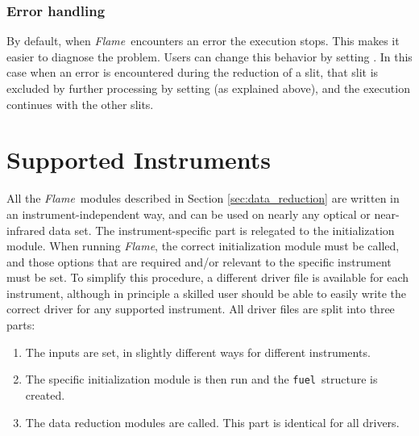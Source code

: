 \documentclass[a4paper]{article}
\newcommand{\flame}{\emph{Flame}}
\newcommand{\fuel}{\texttt{fuel}}
\begin{document}
\begin{sloppypar}
\subsubsection{Error handling}

By default, when \flame\ encounters an error the execution stops. This makes it easier to diagnose the problem. Users can change this behavior by setting . In this case when an error is encountered during the reduction of a slit, that slit is excluded by further processing by setting  (as explained above), and the execution continues with the other slits.





\section{Supported Instruments}
\label{sec:instruments}

All the \flame\ modules described in Section \ref{sec:data_reduction} are written in an instrument-independent way, and can be used on nearly any optical or near-infrared data set. The instrument-specific part is relegated to the initialization module. When running \flame, the correct initialization module must be called, and those options that are required and/or relevant to the specific instrument must be set. To simplify this procedure, a different driver file is available for each instrument, although in principle a skilled user should be able to easily write the correct driver for any supported instrument. All driver files are split into three parts:
\begin{enumerate}
  \item The inputs are set, in slightly different ways for different instruments.
  \item The specific initialization module is then run and the \fuel\ structure is created.
  \item The data reduction modules are called. This part is identical for all drivers.
\end{enumerate}


\end{sloppypar}
\end{document}
